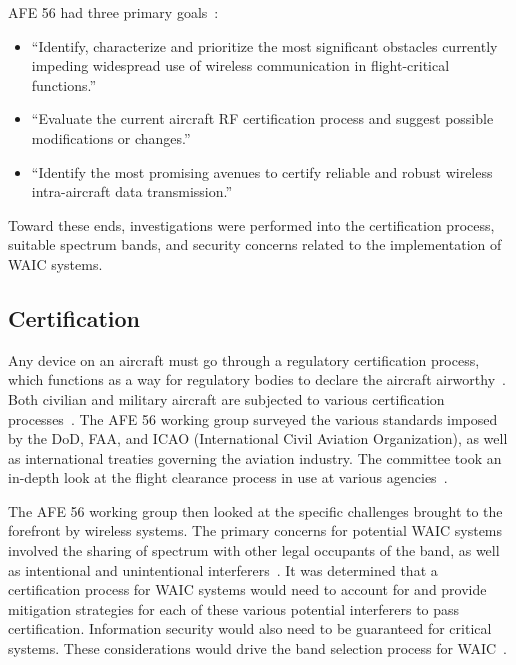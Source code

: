 AFE 56 had three primary goals~\cite{ferrell_feasibility_2007}: 

\begin{itemize}
\item ``Identify, characterize and prioritize the most significant obstacles currently impeding widespread use of wireless communication in flight-critical functions.''

\item ``Evaluate the current aircraft RF certification process and suggest possible modifications or changes.''

\item ``Identify the most promising avenues to certify reliable and robust wireless intra-aircraft data transmission.''
\end{itemize}

Toward these ends, investigations were performed into the certification process, suitable spectrum bands, and security concerns related to the implementation of WAIC systems. 

\subsection{Certification}
Any device on an aircraft must go through a regulatory certification process, which functions as a way for regulatory bodies to declare the aircraft airworthy~\cite{ferrell_feasibility_2007}. Both civilian and military aircraft are subjected to various certification processes~\cite{ferrell_feasibility_2007}. The AFE 56 working group surveyed the various standards imposed by the DoD, FAA, and ICAO (International Civil Aviation Organization), as well as international treaties governing the aviation industry. The committee took an in-depth look at the flight clearance process in use at various agencies~\cite{ferrell_feasibility_2007}. 

The AFE 56 working group then looked at the specific challenges brought to the forefront by wireless systems. The primary concerns for potential WAIC  systems involved the sharing of spectrum with other legal occupants of the band,  as well as intentional and unintentional interferers~\cite{ferrell_feasibility_2007}. It was determined that a certification process for WAIC systems would need to account for and provide mitigation strategies for each of these various potential interferers to pass certification. Information security would also need to be guaranteed for critical systems. These considerations would drive the band selection process for WAIC~\cite{ferrell_feasibility_2007}. 


